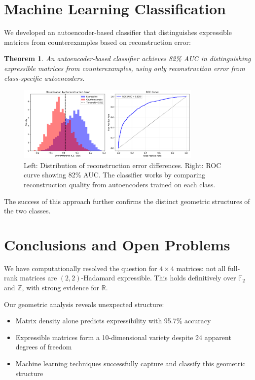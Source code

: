 \documentclass[11pt]{amsart}
\theoremstyle{plain}
\newtheorem{theorem}{Theorem}
\theoremstyle{definition}
\theoremstyle{remark}
\begin{document}
\section{Machine Learning Classification}

We developed an autoencoder-based classifier that distinguishes expressible matrices from counterexamples based on reconstruction error:

\begin{theorem}
An autoencoder-based classifier achieves 82\% AUC in distinguishing expressible matrices from counterexamples, using only reconstruction error from class-specific autoencoders.
\end{theorem}

\begin{figure}[H]
\centering
\includegraphics[width=0.8\textwidth]{../autoencoder_classifier.png}
\caption{Left: Distribution of reconstruction error differences. Right: ROC curve showing 82\% AUC. The classifier works by comparing reconstruction quality from autoencoders trained on each class.}
\end{figure}

The success of this approach further confirms the distinct geometric structures of the two classes.

\section{Conclusions and Open Problems}

We have computationally resolved the question for $4 \times 4$ matrices: not all full-rank matrices are $(2,2)$-Hadamard expressible. This holds definitively over $\mathbb{F}_2$ and $\mathbb{Z}$, with strong evidence for $\mathbb{R}$.

Our geometric analysis reveals unexpected structure:
\begin{itemize}
\item Matrix density alone predicts expressibility with 95.7\% accuracy
\item Expressible matrices form a 10-dimensional variety despite 24 apparent degrees of freedom
\item Machine learning techniques successfully capture and classify this geometric structure
\end{itemize}
\end{document}
